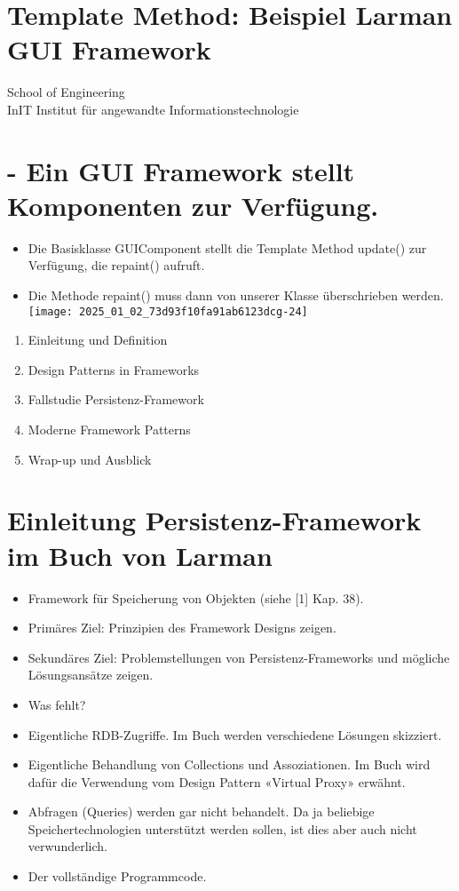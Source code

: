 \section*{Template Method: Beispiel Larman GUI Framework}
School of Engineering\\
InIT Institut für angewandte Informationstechnologie

\section*{- Ein GUI Framework stellt Komponenten zur Verfügung.}
\begin{itemize}
  \item Die Basisklasse GUIComponent stellt die Template Method update() zur Verfügung, die repaint() aufruft.
  \item Die Methode repaint() muss dann von unserer Klasse überschrieben werden.\\
\texttt{[image: 2025\_01\_02\_73d93f10fa91ab6123dcg-24]}
\end{itemize}

\begin{enumerate}
  \item Einleitung und Definition
  \item Design Patterns in Frameworks
  \item Fallstudie Persistenz-Framework
  \item Moderne Framework Patterns
  \item Wrap-up und Ausblick
\end{enumerate}

\section*{Einleitung Persistenz-Framework im Buch von Larman}
\begin{itemize}
  \item Framework für Speicherung von Objekten (siehe [1] Kap. 38).
  \item Primäres Ziel: Prinzipien des Framework Designs zeigen.
  \item Sekundäres Ziel: Problemstellungen von Persistenz-Frameworks und mögliche Lösungsansätze zeigen.
  \item Was fehlt?
  \item Eigentliche RDB-Zugriffe. Im Buch werden verschiedene Lösungen skizziert.
  \item Eigentliche Behandlung von Collections und Assoziationen. Im Buch wird dafür die Verwendung vom Design Pattern «Virtual Proxy» erwähnt.
  \item Abfragen (Queries) werden gar nicht behandelt. Da ja beliebige Speichertechnologien unterstützt werden sollen, ist dies aber auch nicht verwunderlich.
  \item Der vollständige Programmcode.
\end{itemize}

